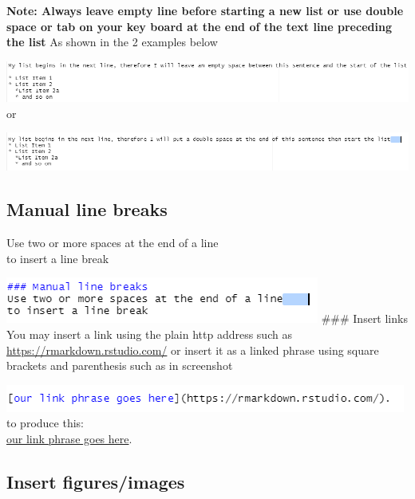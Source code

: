 \documentclass[
]{book}
\let\origfigure\figure
\let\endorigfigure\endfigure
\renewenvironment{figure}[1][2] {
    \expandafter\origfigure\expandafter[H]
} {
    \endorigfigure
}
\begin{document}
\textbf{Note: Always leave empty line before starting a new list or use double space or tab on your key board at the end of the text line preceding the list}
As shown in the 2 examples below

\includegraphics{tutorial_screenshots/listing_empty_space.png}
or

\begin{figure}
\centering
\includegraphics{tutorial_screenshots/listing_space2.png}
\caption{list2}
\end{figure}

\hypertarget{manual-line-breaks}{%
\subsection{Manual line breaks}\label{manual-line-breaks}}

Use two or more spaces at the end of a line\\
to insert a line break

\includegraphics{tutorial_screenshots/line_break.png}
\#\#\# Insert links
You may insert a link using the plain http address such as \url{https://rmarkdown.rstudio.com/} or insert it as a linked phrase using square brackets and parenthesis such as in screenshot

\includegraphics{tutorial_screenshots/link_phrase.png}\\
to produce this:\\
\href{https://rmarkdown.rstudio.com/}{our link phrase goes here}.

\hypertarget{insert-figuresimages}{%
\subsection{Insert figures/images}\label{insert-figuresimages}}
\end{document}
